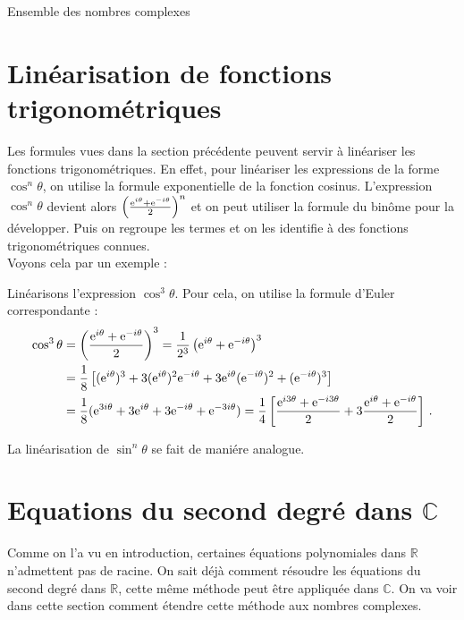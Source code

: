 \begin{chapter}{Ensemble des nombres complexes}
\section{Lin\'earisation de fonctions trigonom\'etriques}
%
%
Les formules vues dans la section pr\'ec\'edente peuvent servir \`a lin\'eariser les fonctions trigonom\'etriques.
En effet, pour lin\'eariser les expressions de la forme $\cos ^n \theta$, on utilise la formule exponentielle de la fonction cosinus.
L'expression $\cos ^n \theta$ devient alors $\left( \frac{ \mathrm{e}^{i \theta} + \mathrm{e}^{-i \theta} }{ 2 } \right)^n$ et on peut utiliser la formule du bin\^ome pour la d\'evelopper.
Puis on regroupe les termes et on les identifie \`a des fonctions trigonom\'etriques connues. \\
Voyons cela par un exemple :
\begin{ex}
	      Lin\'earisons l'expression $\cos ^3 \theta$.
	      Pour cela, on utilise la formule d'Euler correspondante :
      \begin{align*}
            \cos ^3 \theta & = \left( \frac{\mathrm{e}^{i \theta } + \mathrm{e}^{- i \theta }}{2} \right)^3                            
                             = \frac{1}{2^3} \left( \mathrm{e}^{i \theta} + \mathrm{e}^{ - i \theta} \right)^3                         \\
                           & = \frac{1}{8} \left[ (\mathrm{e}^{i \theta})^3 + 3 (\mathrm{e}^{i \theta})^2 \mathrm{e}^{-i \theta} 
                                 + 3 \mathrm{e}^{ i \theta} (\mathrm{e}^{-i \theta})^2 + (\mathrm{e}^{-i \theta})^3 \right]                  \\
                           & = \frac{1}{8} (\mathrm{e}^{3i \theta} + 3 \mathrm{e}^{i \theta} + 3 \mathrm{e}^{-i \theta} + \mathrm{e}^{-3i \theta}) 
                             = \frac{1}{4} \left[ \frac{\mathrm{e}^{i 3\theta} + \mathrm{e}^{-i 3\theta}}{2} 
                                 + 3 \frac{ \mathrm{e}^{i \theta} + \mathrm{e}^{-i \theta} }{2} \right]                                \,.
      \end{align*}
\end{ex}

La lin\'earisation de $\sin ^n \theta$ se fait de mani\'ere analogue.

\section{Equations du second degr\'e dans $\mathbb{C}$}
%
%
Comme on l'a vu en introduction, certaines \'equations polynomiales dans $\mathbb{R}$ n'admettent pas de racine.
On sait d\'ej\`a comment r\'esoudre les \'equations du second degr\'e dans $\mathbb{R}$, cette m\^eme m\'ethode peut \^etre appliqu\'ee dans $\mathbb{C}$.
On va voir dans cette section comment \'etendre cette m\'ethode aux nombres complexes.
%

\end{chapter}
